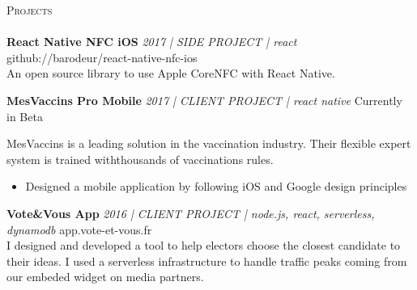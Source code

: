 \documentclass[a4paper]{article}
\newcommand{\lineunder} {
    \vspace*{-8pt} \\
    \hspace*{-18pt} \hrulefill \\
}
\newcommand{\header} [1] {
    {\hspace*{-18pt}\vspace*{6pt} \textsc{#1}}
    \vspace*{-6pt} \lineunder
}
\begin{document}
\header{Projects}
{\textbf{React Native NFC iOS} \sl 2017 | SIDE PROJECT | react} \hfill github://barodeur/react-native-nfc-ios\\
An open source library to use Apple CoreNFC with React Native.\\
\vspace*{2mm}


{\textbf{MesVaccins Pro Mobile} \sl 2017 | CLIENT PROJECT | react native} \hfill Currently in Beta\\
\begin{itshape}
MesVaccins is a leading solution in the vaccination industry.
Their flexible expert system is trained withthousands of vaccinations rules.
\end{itshape}

\vspace{-\topsep}
\begin{itemize}
    \item Designed a mobile application by following iOS and Google design principles
\end{itemize}
\vspace{-\topsep}


\vspace*{2mm}

{\textbf{Vote\&Vous App} \sl 2016 | CLIENT PROJECT | node.js, react, serverless, dynamodb} \hfill app.vote-et-vous.fr\\
I designed and developed a tool to help electors choose the closest candidate to their ideas.
I used a serverless infrastructure to handle traffic peaks coming from our embeded widget on media partners.
\vspace*{2mm}
\end{document}
